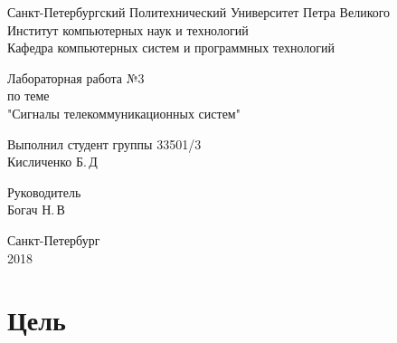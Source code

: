 \documentclass[12pt,a4paper]{scrartcl}
\begin{document}
\begin{titlepage}
  \begin{center}
    Санкт-Петербургский Политехнический Университет     Петра Великого \\
    
    Институт компьютерных наук и технологий \\
    
    Кафедра компьютерных систем и программных технологий
  \end{center}
  
  \vfill
  
  \begin{center}
  Лабораторная работа №3\\
  по теме\\
  "Сигналы телекоммуникационных
систем"\\
\end{center}

\vfill

\newlength{\ML}
\hfill\begin{minipage}{0.4\textwidth}
  Выполнил студент группы 33501/3\\
  \underline{\hspace{\ML}} Кисличенко Б.\,Д\\
\end{minipage}%

\bigskip

\hfill\begin{minipage}{0.4\textwidth}
  Руководитель\\
  \underline{\hspace{\ML}} Богач Н.\,В\\
\end{minipage}%

\vfill
 
\begin{center}
  Санкт-Петербург\\
2018 
\end{center}

\end{titlepage}

\section{Цель}
\label{sec:goal}
\end{document}
